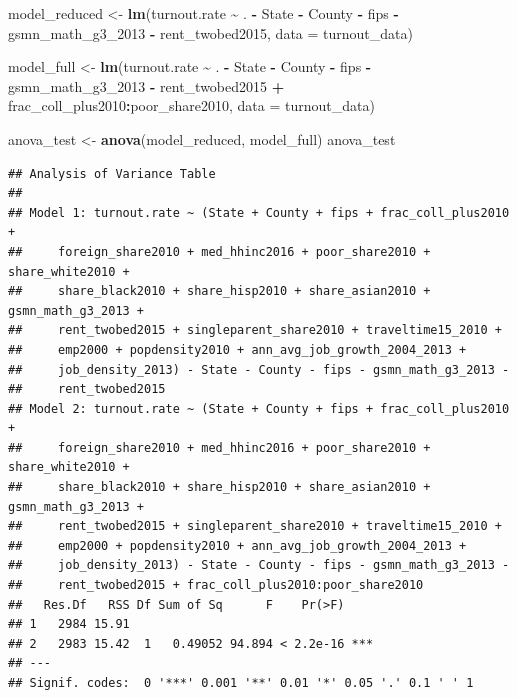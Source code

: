 \documentclass[
]{article}
\newenvironment{Shaded}{\begin{snugshade}}{\end{snugshade}}
\newcommand{\AttributeTok}[1]{\textcolor[rgb]{0.13,0.29,0.53}{#1}}
\newcommand{\FunctionTok}[1]{\textcolor[rgb]{0.13,0.29,0.53}{\textbf{#1}}}
\newcommand{\NormalTok}[1]{#1}
\newcommand{\OtherTok}[1]{\textcolor[rgb]{0.56,0.35,0.01}{#1}}
\newcommand{\SpecialCharTok}[1]{\textcolor[rgb]{0.81,0.36,0.00}{\textbf{#1}}}
\begin{document}
\begin{Shaded}
\begin{Highlighting}[]
\NormalTok{model\_reduced }\OtherTok{\textless{}{-}} \FunctionTok{lm}\NormalTok{(turnout.rate }\SpecialCharTok{\textasciitilde{}}\NormalTok{ . }\SpecialCharTok{{-}}\NormalTok{ State }\SpecialCharTok{{-}}\NormalTok{ County }\SpecialCharTok{{-}}\NormalTok{ fips }\SpecialCharTok{{-}}\NormalTok{ gsmn\_math\_g3\_2013 }\SpecialCharTok{{-}}\NormalTok{ rent\_twobed2015, }\AttributeTok{data =}\NormalTok{ turnout\_data)}

\NormalTok{model\_full }\OtherTok{\textless{}{-}} \FunctionTok{lm}\NormalTok{(turnout.rate }\SpecialCharTok{\textasciitilde{}}\NormalTok{ . }\SpecialCharTok{{-}}\NormalTok{ State }\SpecialCharTok{{-}}\NormalTok{ County }\SpecialCharTok{{-}}\NormalTok{ fips }\SpecialCharTok{{-}}\NormalTok{ gsmn\_math\_g3\_2013 }\SpecialCharTok{{-}}\NormalTok{ rent\_twobed2015 }
                 \SpecialCharTok{+}\NormalTok{ frac\_coll\_plus2010}\SpecialCharTok{:}\NormalTok{poor\_share2010, }
                 \AttributeTok{data =}\NormalTok{ turnout\_data)}

\NormalTok{anova\_test }\OtherTok{\textless{}{-}} \FunctionTok{anova}\NormalTok{(model\_reduced, model\_full)}
\NormalTok{anova\_test}
\end{Highlighting}
\end{Shaded}

\begin{verbatim}
## Analysis of Variance Table
## 
## Model 1: turnout.rate ~ (State + County + fips + frac_coll_plus2010 + 
##     foreign_share2010 + med_hhinc2016 + poor_share2010 + share_white2010 + 
##     share_black2010 + share_hisp2010 + share_asian2010 + gsmn_math_g3_2013 + 
##     rent_twobed2015 + singleparent_share2010 + traveltime15_2010 + 
##     emp2000 + popdensity2010 + ann_avg_job_growth_2004_2013 + 
##     job_density_2013) - State - County - fips - gsmn_math_g3_2013 - 
##     rent_twobed2015
## Model 2: turnout.rate ~ (State + County + fips + frac_coll_plus2010 + 
##     foreign_share2010 + med_hhinc2016 + poor_share2010 + share_white2010 + 
##     share_black2010 + share_hisp2010 + share_asian2010 + gsmn_math_g3_2013 + 
##     rent_twobed2015 + singleparent_share2010 + traveltime15_2010 + 
##     emp2000 + popdensity2010 + ann_avg_job_growth_2004_2013 + 
##     job_density_2013) - State - County - fips - gsmn_math_g3_2013 - 
##     rent_twobed2015 + frac_coll_plus2010:poor_share2010
##   Res.Df   RSS Df Sum of Sq      F    Pr(>F)    
## 1   2984 15.91                                  
## 2   2983 15.42  1   0.49052 94.894 < 2.2e-16 ***
## ---
## Signif. codes:  0 '***' 0.001 '**' 0.01 '*' 0.05 '.' 0.1 ' ' 1
\end{verbatim}
\end{document}
